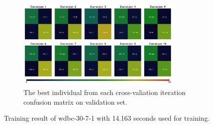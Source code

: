 \documentclass{article}
\begin{document}
\begin{figure}[ht]
\begin{subfigure}{\textwidth}
        \label{fig:3b}
    \end{subfigure}
    \begin{subfigure}{\textwidth}   
        \centering
        \includegraphics[width=0.89\textwidth]{wdbc-30-7-1/conf_mat}
        \caption{The best individual from each cross-valiation iteration confusion matrix on validation set.}
        \label{fig:3c}
    \end{subfigure}
    \caption{Training result of wdbc-30-7-1 with 14.163 seconds used for training.}
    \label{fig:3}
\end{figure}
\FloatBarrier
\end{document}
